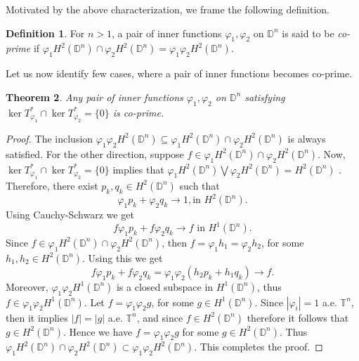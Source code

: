 \documentclass[12pt, a4 paper]{amsart}
\newcommand{\D}{\mathbb{D}}
\theoremstyle{definition}
\theoremstyle{plain}
\newtheorem{thm}{Theorem}[section]
\theoremstyle{definition}
\newtheorem{defn}[thm]{Definition}
\numberwithin{equation}{section}
\let\phi=\varphi
\begin{document}
Motivated by the above characterization, we frame the following definition.
\begin{defn}\label{co-pr}
For $n>1$, a pair of inner functions $\phi_1, \phi_2$ on $\D^n$ is said to be \textit{co-prime} if $\phi_1 H^2(\D^n) \cap \phi_2 H^2(\D^n) =\phi_1 \phi_2 H^2(\D^n)$.
\end{defn}
Let us now identify few cases, where a pair of inner functions becomes co-prime.
\begin{thm}\label{prod_inner}
Any pair of inner functions $\phi_1,\phi_2$ on $\mathbb{D}^n$ satisfying $\ker T_{\phi_1}^* \cap \ker T_{\phi_2}^* = \{0\}$ is co-prime.
    \end{thm}
    \begin{proof}
The inclusion $\phi_1\phi_2H^2(\D^n) \subseteq \phi_1H^2(\D^n) \cap\phi_2 H^2(\D^n)$ is always satisfied. For the other direction, suppose $f\in \phi_1H^2(\D^n) \cap\phi_2H^2(\D^n)$. Now, $\ker T_{\phi_1}^* \cap \ker T_{\phi_2}^* = \{0\}$ implies that $\phi_1 H^2(\D^n) \bigvee \phi_2 H^2(\D^n)=H^2(\D^n)$ . Therefore, there exist $p_k,q_k\in H^2(\D^n)$ such that $$\phi_1p_k+\phi_2q_k\rightarrow 1,\text{in }H^2(\D^n).$$ Using Cauchy-Schwarz we get $$f\phi_1p_k+f\phi_2q_k\rightarrow f\text{ in }H^1(\D^n).$$ Since $f\in \phi_1H^2(\D^n) \cap \phi_2H^2(\D^n)$, then $f=\phi_1h_1=\phi_2h_2$, for some $h_1,h_2\in H^2(\D^n)$. Using this we get $$f\phi_1p_k+f\phi_2q_k=\phi_1\phi_2(h_2p_k+h_1q_k)\rightarrow f.$$ Moreover, $\phi_1\phi_2H^1(\D^n)$ is a closed subspace in $H^1(\D^n)$, thus $f\in \phi_1\phi_2H^1(\D^n)$. Let $f=\phi_1\phi_2 g$, for some $g\in H^1(\D^n)$. Since $|\phi_i|=1$ a.e. $\mathbb{T}^n$, then it implies $|f|=|g|$ a.e. $\mathbb{T}^n$, and since $f\in H^2(\D^n)$ therefore it follows that $g\in H^2(\D^n)$. Hence we have $f=\phi_1\phi_2g$ for some $g\in H^2(\D^n)$. Thus $\phi_1 H^2(\D^n) \cap \phi_2 H^2(\D^n) \subset \phi_1\phi_2H^2(\D^n)$. This completes the proof.
    \end{proof}
\end{document}
